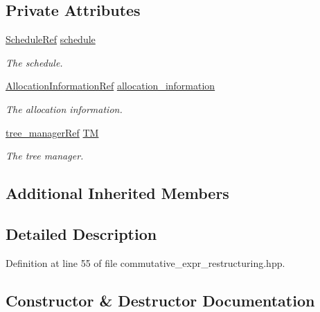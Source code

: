 \subsection*{Private Attributes}
\begin{DoxyCompactItemize}
\item 
\hyperlink{schedule_8hpp_af67f402958b3b52a1ec5cc4ce08ae3b9}{Schedule\+Ref} \hyperlink{classcommutative__expr__restructuring_ab967d188173d0b831dcfbc13d2c69787}{schedule}
\begin{DoxyCompactList}\small\item\em The schedule. \end{DoxyCompactList}\item 
\hyperlink{allocation__information_8hpp_ad90a86da153cba50cbcefc4679036755}{Allocation\+Information\+Ref} \hyperlink{classcommutative__expr__restructuring_a0361afa8ec9f530d6f712270b6ce92f4}{allocation\+\_\+information}
\begin{DoxyCompactList}\small\item\em The allocation information. \end{DoxyCompactList}\item 
\hyperlink{tree__manager_8hpp_a96ff150c071ce11a9a7a1e40590f205e}{tree\+\_\+manager\+Ref} \hyperlink{classcommutative__expr__restructuring_acb765c986a56e2f4b9bd8329c73b7187}{TM}
\begin{DoxyCompactList}\small\item\em The tree manager. \end{DoxyCompactList}\end{DoxyCompactItemize}
\subsection*{Additional Inherited Members}


\subsection{Detailed Description}


Definition at line 55 of file commutative\+\_\+expr\+\_\+restructuring.\+hpp.



\subsection{Constructor \& Destructor Documentation}
\mbox{\label{classcommutative__expr__restructuring_aa4c5653385cc2917ada9cf5ee3936cd3}} 
